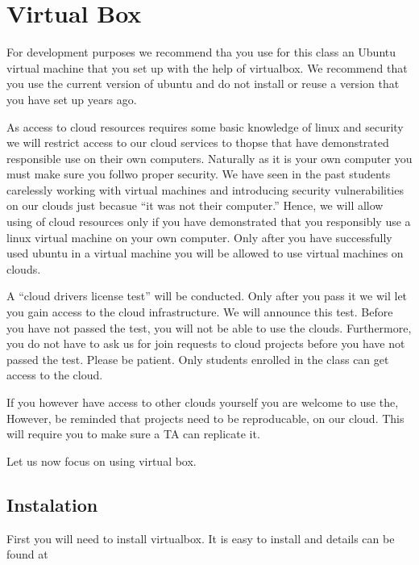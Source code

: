 

\chapter{Virtual Box}
\label{S:virtual-box}

\FILENAME

For development purposes we recommend tha you use for this class an
Ubuntu virtual machine that you set up with the help of virtualbox. We
recommend that you use the current version of ubuntu and do not
install or reuse a version that you have set up years ago.

As access to cloud resources requires some basic knowledge of linux
and security we will restrict access to our cloud services to thopse
that have demonstrated responsible use on their own
computers. Naturally as it is your own computer you must make sure you
follwo proper security. We have seen in the past students carelessly
working with virtual machines and introducing security vulnerabilities
on our clouds just becasue ``it was not their computer.'' Hence, we
will allow using of cloud resources only if you have demonstrated that
you responsibly use a linux virtual machine on your own computer.
Only after you have successfully used ubuntu in a virtual machine you
will be allowed to use virtual machines on clouds.

A ``cloud drivers license test'' will be conducted. Only after you
pass it we wil let you gain access to the cloud infrastructure. We
will announce this test. Before you have not passed the test, you will
not be able to use the clouds.  Furthermore, you do not have to ask us
for join requests to cloud projects before you have not passed the
test. Please be patient. Only students enrolled in the class can get
access to the cloud. 

If you however have access to other clouds yourself you are welcome to
use the, However, be reminded that projects need to be reproducable,
on our cloud. This will require you to make sure a TA can replicate it.

Let us now focus on using virtual box.

\section{Instalation}\label{creation}

First you will need to install virtualbox. It is easy to install and
details can be found at


